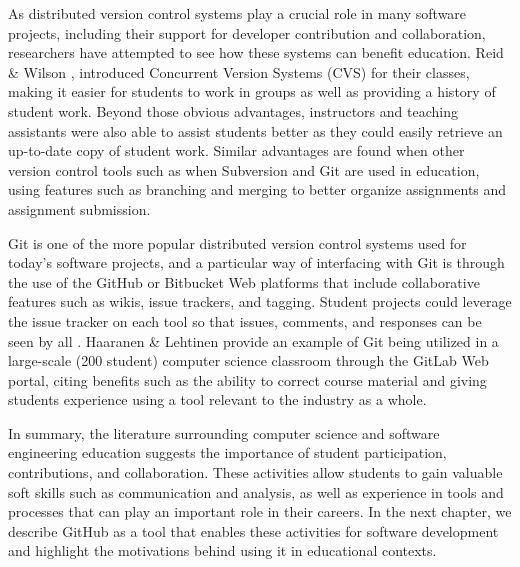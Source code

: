 As distributed version control systems play a crucial role in many software projects, including their support for developer contribution and collaboration, researchers have attempted to see how these systems can benefit education. Reid \& Wilson \cite{reid2005learning}, introduced Concurrent Version Systems (CVS) for their classes, making it easier for students to work in groups as well as providing a history of student work. Beyond those obvious advantages, instructors and teaching assistants were also able to assist students better as they could easily retrieve an up-to-date copy of student work. Similar advantages are found when other version control tools such as when Subversion \cite{clifton2007subverting} and Git \cite{griffin2013github} are used in education, using features such as branching and merging to better organize assignments and assignment submission.

Git is one of the more popular distributed version control systems used for today's software projects, and a particular way of interfacing with Git is through the use of the GitHub or Bitbucket Web platforms that include collaborative features such as wikis, issue trackers, and tagging. Student projects could leverage the issue tracker on each tool so that issues, comments, and responses can be seen by all \cite{kelleher2014employing}. Haaranen & Lehtinen \cite{haaranen2015teaching} provide an example of Git being utilized in a large-scale (200 student) computer science classroom through the GitLab Web portal, citing benefits such as the ability to correct course material and giving students experience using a tool relevant to the industry as a whole.

In summary, the literature surrounding computer science and software engineering education suggests the importance of student participation, contributions, and collaboration. These activities allow students to gain valuable soft skills such as communication and analysis, as well as experience in tools and processes that  can play an important role in their careers. In the next chapter, we describe GitHub as a tool that enables these activities for software development and highlight the motivations behind using it in educational contexts.





